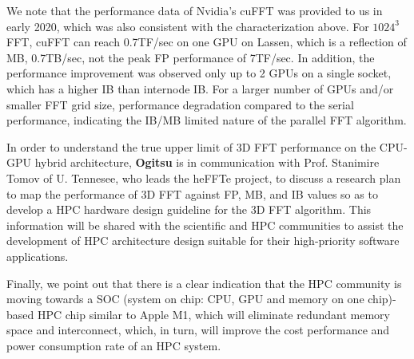 We note that the performance data of Nvidia's cuFFT was provided to us in early 2020, which was also consistent with the characterization above. For $1024^3$ FFT, cuFFT can reach 0.7TF/sec on one GPU on Lassen, which is a reflection of MB, 0.7TB/sec, not the peak FP performance of 7TF/sec. In addition, the performance improvement was observed only up to 2 GPUs on a single socket, which has a higher IB than internode IB. For a larger number of GPUs and/or smaller FFT grid size, performance degradation compared to the serial performance, indicating the IB/MB limited nature of the parallel FFT algorithm.  

In order to understand the true upper limit of 3D FFT performance on the CPU-GPU hybrid architecture, {\bf Ogitsu} is in communication with Prof. Stanimire Tomov of U. Tennesee, who leads the heFFTe project, to discuss a research plan to map the performance of 3D FFT against FP, MB, and IB values so as to develop a HPC hardware design guideline for the 3D FFT algorithm. This information will be shared with the scientific and HPC communities to assist the development of HPC architecture design suitable for their high-priority software applications.

Finally, we point out that there is a clear indication that the HPC community is moving towards a SOC (system on chip: CPU, GPU and memory on one chip)-based HPC chip similar to Apple M1, which will eliminate redundant memory space and interconnect, which, in turn, will improve the cost performance and power consumption rate of an HPC system.


